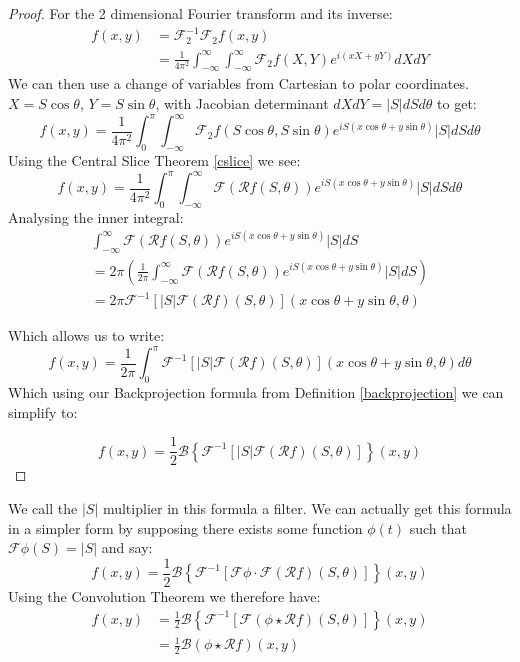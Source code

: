 \documentclass{article}
\theoremstyle{definition}
\begin{document}
\begin{proof}
For the 2 dimensional Fourier transform and its inverse:
\begin{align}
f(x,y) &= \mathcal{F}_2^{-1} \mathcal{F}_2 f(x,y) \\
&= \frac{1}{4 \pi^2} \int_{-\infty}^{\infty} \int_{-\infty}^{\infty} \mathcal{F}_2 f(X, Y) e^{i (x X + yY)}dXdY
\end{align}
We can then use a change of variables from Cartesian to polar coordinates.
$X = S \cos \theta$, $Y = S \sin \theta$, with Jacobian determinant $dXdY = |S| dS  d\theta$ to get:
$$
f(x,y) = \frac{1}{4 \pi^2} \int_{0}^{\pi} \int_{-\infty}^{\infty} \mathcal{F}_2 f(S \cos \theta, S \sin \theta) e^{i S(x \cos \theta + y \sin \theta)} |S|dSd\theta
$$
Using the Central Slice Theorem \ref{cslice} we see:
$$
f(x,y) = \frac{1}{4 \pi^2} \int_{0}^{\pi} \int_{-\infty}^{\infty} \mathcal{F}(\mathcal{R} f(S , \theta)) e^{i S(x \cos \theta + y \sin \theta)} |S|dSd\theta
$$
Analysing the inner integral:
\begin{align*}
\int_{-\infty}^{\infty} \mathcal{F}(\mathcal{R} f(S , \theta)) e^{i S(x \cos \theta + y \sin \theta)} |S|dS \\
= 2\pi \left( \frac{1}{2 \pi} \int_{-\infty}^{\infty} \mathcal{F}(\mathcal{R} f(S , \theta)) e^{i S(x \cos \theta + y \sin \theta)} |S|dS \right) \\
= 2\pi \mathcal{F}^{-1} \left[ |S| \mathcal{F} \left( \mathcal{R}f \right) \left( S, \theta \right) \right] (x \cos \theta + y \sin \theta, \theta)
\end{align*}

Which allows us to write:
$$
f(x,y) = \frac{1}{2 \pi} \int_{0}^{\pi} \mathcal{F}^{-1} \left[ |S| \mathcal{F} \left( \mathcal{R}f \right) \left( S, \theta \right) \right] (x \cos \theta + y \sin \theta, \theta) d\theta
$$
Which using our Backprojection formula from Definition \ref{backprojection} we can simplify to:

$$
f(x,y) = \frac{1}{2} \mathcal{B} \left\lbrace \mathcal{F}^{-1} \left[ |S| \mathcal{F} \left( \mathcal{R}f \right) \left( S, \theta \right) \right] \right\rbrace (x,y)
$$
\end{proof}

We call the $|S|$ multiplier in this formula a filter. We can actually get this formula in a simpler form by supposing there exists some function $\phi(t)$ such that $\mathcal{F}\phi (S) = |S|$ and say:
$$
f(x,y) = \frac{1}{2} \mathcal{B} \left\lbrace \mathcal{F}^{-1} \left[ \mathcal{F}\phi \cdot \mathcal{F} \left( \mathcal{R}f \right) \left( S, \theta \right) \right] \right\rbrace (x,y)
$$
Using the Convolution Theorem \cite{wolfram_convolution} we therefore have:
\begin{align*}
f(x,y) &= \frac{1}{2} \mathcal{B} \left\lbrace \mathcal{F}^{-1} \left[ \mathcal{F} \left(\phi \star \mathcal{R}f \right) \left( S, \theta \right) \right] \right\rbrace (x,y) \\
&= \frac{1}{2} \mathcal{B} \left(\phi \star \mathcal{R}f \right) (x,y)
\end{align*}
\end{document}
